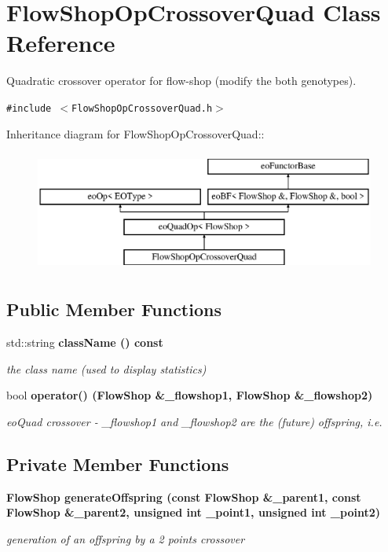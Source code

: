 \section{Flow\-Shop\-Op\-Crossover\-Quad Class Reference}
\label{classFlowShopOpCrossoverQuad}
Quadratic crossover operator for flow-shop (modify the both genotypes).  


{\tt \#include $<$Flow\-Shop\-Op\-Crossover\-Quad.h$>$}

Inheritance diagram for Flow\-Shop\-Op\-Crossover\-Quad::\begin{figure}[H]
\begin{center}
\leavevmode
\includegraphics[height=4cm]{classFlowShopOpCrossoverQuad}
\end{center}
\end{figure}
\subsection*{Public Member Functions}
\begin{CompactItemize}
\item 
std::string \bf{class\-Name} () const \label{classFlowShopOpCrossoverQuad_60ac69b87970b7000980f65aa6ead44a}

\begin{CompactList}\small\item\em the class name (used to display statistics) \item\end{CompactList}\item 
bool \bf{operator()} (\bf{Flow\-Shop} \&\_\-flowshop1, \bf{Flow\-Shop} \&\_\-flowshop2)
\begin{CompactList}\small\item\em eo\-Quad crossover - \_\-flowshop1 and \_\-flowshop2 are the (future) offspring, i.e. \item\end{CompactList}\end{CompactItemize}
\subsection*{Private Member Functions}
\begin{CompactItemize}
\item 
\bf{Flow\-Shop} \bf{generate\-Offspring} (const \bf{Flow\-Shop} \&\_\-parent1, const \bf{Flow\-Shop} \&\_\-parent2, unsigned int \_\-point1, unsigned int \_\-point2)
\begin{CompactList}\small\item\em generation of an offspring by a 2 points crossover \item\end{CompactList}\end{CompactItemize}



